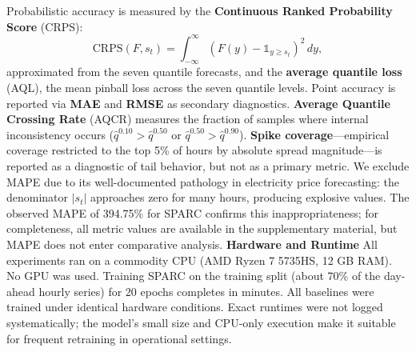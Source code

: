 \documentclass[twoside]{article}
\begin{document}
Probabilistic accuracy is measured by the \textbf{Continuous Ranked Probability Score} (CRPS):
$$\text{CRPS}(F, s_t) = \int_{-\infty}^{\infty} (F(y) - \mathbb{1}_{y \geq s_t})^2 \, dy,$$
approximated from the seven quantile forecasts, and the \textbf{average quantile loss} (AQL), the mean pinball loss across the seven quantile levels. Point accuracy is reported via \textbf{MAE} and \textbf{RMSE} as secondary diagnostics. \textbf{Average Quantile Crossing Rate} (AQCR) measures the fraction of samples where internal inconsistency occurs ($\hat{q}^{0.10} > \hat{q}^{0.50}$ or $\hat{q}^{0.50} > \hat{q}^{0.90}$). \textbf{Spike coverage}---empirical coverage restricted to the top 5\% of hours by absolute spread magnitude---is reported as a diagnostic of tail behavior, but not as a primary metric.
We exclude MAPE due to its well-documented pathology in electricity price forecasting: the denominator $|s_t|$ approaches zero for many hours, producing explosive values. The observed MAPE of 394.75\% for SPARC confirms this inappropriateness; for completeness, all metric values are available in the supplementary material, but MAPE does not enter comparative analysis.
\textbf{Hardware and Runtime}
All experiments ran on a commodity CPU (AMD Ryzen 7 5735HS, 12 GB RAM). No GPU was used. Training SPARC on the training split (about 70\% of the day-ahead hourly series) for 20 epochs completes in minutes. All baselines were trained under identical hardware conditions. Exact runtimes were not logged systematically; the model's small size and CPU-only execution make it suitable for frequent retraining in operational settings.
\end{document}
